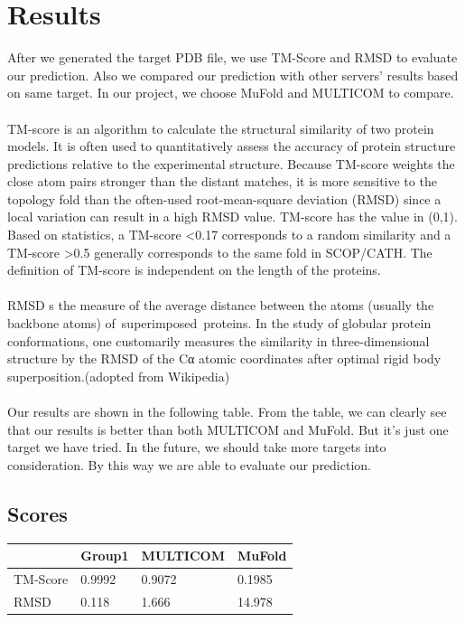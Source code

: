 \documentclass{article}
\begin{document}
\section{Results}

After we generated the target PDB file, we use TM-Score and RMSD to evaluate our prediction. Also we compared our prediction with other servers’ results based on same target. In our project, we choose MuFold and MULTICOM to compare.\\\\
TM-score is an algorithm to calculate the structural similarity of two protein models. It is often used to quantitatively assess the accuracy of protein structure predictions relative to the experimental structure. Because TM-score weights the close atom pairs stronger than the distant matches, it is more sensitive to the topology fold than the often-used root-mean-square deviation (RMSD) since a local variation can result in a high RMSD value. TM-score has the value in (0,1). Based on statistics, a TM-score \textless0.17 corresponds to a random similarity and a TM-score \textgreater0.5 generally corresponds to the same fold in SCOP/CATH. The definition of TM-score is independent on the length of the proteins.\\\\
RMSD s the measure of the average distance between the atoms (usually the backbone atoms) of superimposed proteins. In the study of globular protein conformations, one customarily measures the similarity in three-dimensional structure by the RMSD of the Cα atomic coordinates after optimal rigid body superposition.(adopted from Wikipedia)\\\\
Our results are shown in the following table. From the table, we can clearly see that our results is better than both MULTICOM and MuFold. But it’s just one target we have tried. In the future, we should take more targets into consideration. By this way we are able to evaluate our prediction.

\subsection{Scores}
\begin{center}
    \begin{tabular}{ | l | l | l | p{2cm} |}
    \hline
      & Group1 & MULTICOM & MuFold \\ \hline
    TM-Score & 0.9992 & 0.9072 & 0.1985 \\ \hline
    RMSD & 0.118 & 1.666 & 14.978 \\
    \hline
    \end{tabular}
\end{center}
\end{document}
